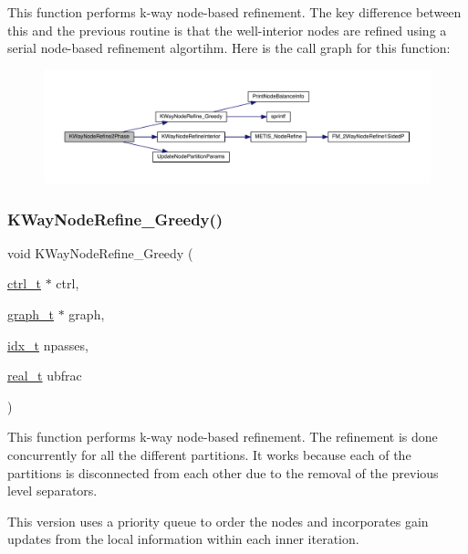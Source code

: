 This function performs k-\/way node-\/based refinement. The key difference between this and the previous routine is that the well-\/interior nodes are refined using a serial node-\/based refinement algortihm. Here is the call graph for this function\+:\nopagebreak
\begin{figure}[H]
\begin{center}
\leavevmode
\includegraphics[width=350pt]{a00383_a5c42d043dc7f9e6d0b955a4d004a7470_cgraph}
\end{center}
\end{figure}
\mbox{\label{a00383_a5c9aaeced318b88b4ad50dcb484d47b1}} 
\subsubsection{\texorpdfstring{K\+Way\+Node\+Refine\+\_\+\+Greedy()}{KWayNodeRefine\_Greedy()}}
{\footnotesize\ttfamily void K\+Way\+Node\+Refine\+\_\+\+Greedy (\begin{DoxyParamCaption}\item[{\hyperlink{a00742}{ctrl\+\_\+t} $\ast$}]{ctrl,  }\item[{\hyperlink{a00734}{graph\+\_\+t} $\ast$}]{graph,  }\item[{\hyperlink{a00876_aaa5262be3e700770163401acb0150f52}{idx\+\_\+t}}]{npasses,  }\item[{\hyperlink{a00876_a1924a4f6907cc3833213aba1f07fcbe9}{real\+\_\+t}}]{ubfrac }\end{DoxyParamCaption})}

This function performs k-\/way node-\/based refinement. The refinement is done concurrently for all the different partitions. It works because each of the partitions is disconnected from each other due to the removal of the previous level separators.

This version uses a priority queue to order the nodes and incorporates gain updates from the local information within each inner iteration.

